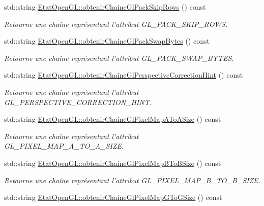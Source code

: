 \begin{DoxyCompactItemize}
std\-::string \hyperlink{group__utilitaire_ga13b70d48642c0b921c0497f1ed7e88fa}{Etat\-Open\-G\-L\-::obtenir\-Chaine\-Gl\-Pack\-Skip\-Rows} () const 
\begin{DoxyCompactList}\small\item\em Retourne une chaîne représentant l'attribut G\-L\-\_\-\-P\-A\-C\-K\-\_\-\-S\-K\-I\-P\-\_\-\-R\-O\-W\-S. \end{DoxyCompactList}\item 
std\-::string \hyperlink{group__utilitaire_ga34c8e9bce5b0b759995934900bc33e14}{Etat\-Open\-G\-L\-::obtenir\-Chaine\-Gl\-Pack\-Swap\-Bytes} () const 
\begin{DoxyCompactList}\small\item\em Retourne une chaîne représentant l'attribut G\-L\-\_\-\-P\-A\-C\-K\-\_\-\-S\-W\-A\-P\-\_\-\-B\-Y\-T\-E\-S. \end{DoxyCompactList}\item 
std\-::string \hyperlink{group__utilitaire_ga2f8a371d540a654c038ff2e3301a63d3}{Etat\-Open\-G\-L\-::obtenir\-Chaine\-Gl\-Perspective\-Correction\-Hint} () const 
\begin{DoxyCompactList}\small\item\em Retourne une chaîne représentant l'attribut G\-L\-\_\-\-P\-E\-R\-S\-P\-E\-C\-T\-I\-V\-E\-\_\-\-C\-O\-R\-R\-E\-C\-T\-I\-O\-N\-\_\-\-H\-I\-N\-T. \end{DoxyCompactList}\item 
std\-::string \hyperlink{group__utilitaire_ga6d92a97f95de6e5eb298d27c342a4375}{Etat\-Open\-G\-L\-::obtenir\-Chaine\-Gl\-Pixel\-Map\-A\-To\-A\-Size} () const 
\begin{DoxyCompactList}\small\item\em Retourne une chaîne représentant l'attribut G\-L\-\_\-\-P\-I\-X\-E\-L\-\_\-\-M\-A\-P\-\_\-\-A\-\_\-\-T\-O\-\_\-\-A\-\_\-\-S\-I\-Z\-E. \end{DoxyCompactList}\item 
std\-::string \hyperlink{group__utilitaire_ga554e72e1ef666b6dca527a1073219c9e}{Etat\-Open\-G\-L\-::obtenir\-Chaine\-Gl\-Pixel\-Map\-B\-To\-B\-Size} () const 
\begin{DoxyCompactList}\small\item\em Retourne une chaîne représentant l'attribut G\-L\-\_\-\-P\-I\-X\-E\-L\-\_\-\-M\-A\-P\-\_\-\-B\-\_\-\-T\-O\-\_\-\-B\-\_\-\-S\-I\-Z\-E. \end{DoxyCompactList}\item 
std\-::string \hyperlink{group__utilitaire_gad80ac227ca04522df384be1e0f93b546}{Etat\-Open\-G\-L\-::obtenir\-Chaine\-Gl\-Pixel\-Map\-G\-To\-G\-Size} () const 

\end{DoxyCompactItemize}
